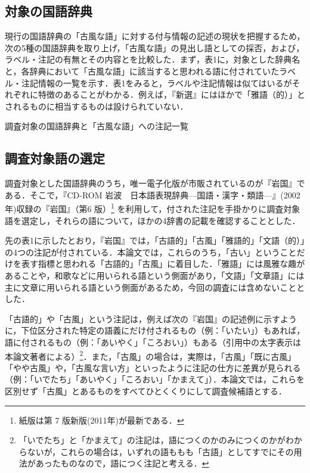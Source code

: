 \documentclass[japanese]{jnlp_1.4}
\newcommand{\MaruOne}{}
\newcommand{\MaruTwo}{}
\begin{document}
\subsection{対象の国語辞典}

現行の国語辞典の「古風な語」に対する付与情報の記述の現状を把握するため，次の5種の国語辞典を取り上げ，「古風な語」の見出し語としての採否，および，ラベル・注記の有無とその内容とを比較した．まず，表1に，対象とした辞典名と，各辞典において「古風な語」に該当すると思われる語に付されていたラベル・注記情報の一覧を示す．表1をみると，ラベルや注記情報は似てはいるがそれぞれに特徴のあることがわかる．例えば，『新選』にはほかで「雅語（的）」とされるものに相当するものは設けられていない．

\begin{table}[t]
\caption{調査対象の国語辞典と「古風な語」への注記一覧}

\end{table}


\subsection{調査対象語の選定}

調査対象とした国語辞典のうち，唯一電子化版が市販されているのが『岩国』である．そこで，『CD-ROM 岩波　日本語表現辞典—国語・漢字・類語—』(2002年)収録の『岩国』（第6
\linebreak
版）\footnote{紙版は第 7 版新版(2011年)が最新である．} を利用して，付された注記を手掛かりに調査対象語を選定し，それらの語について，ほかの4辞書の記載を確認することとした．

先の表1に示したとおり，『岩国』では，「古語的」「古風」「雅語的」「文語（的）」の4つの注記が付されている．本論文では，これらのうち，「古い」ということだけを表す指標と思われる「古語的」「古風」に着目した．「雅語」には風雅な趣があることや，和歌などに用いられる語という側面があり，「文語」「文章語」には主に文章に用いられる語という側面があるため，今回の調査には含めないこととした．

「古語的」や「古風」という注記は，例えば次の『岩国』の記述例に示すように，下位区分された特定の語義にだけ付されるもの（例：「いたい」）もあれば，語に付されるもの（例：「あいやく」「ころおい」）もある（引用中の太字表示は本論文著者による）\footnote{「いでたち」と「かまえて」の注記は，語につくのか\MaruTwo のみにつくのかがわからないが，これらの場合は，いずれの語も\MaruOne も\MaruTwo も「古語」としてすでにその用法があったものなので，語につく注記と考える．}．また，「古風」の場合は，実際は，「古風」「既に古風」「やや古風」や，「古風な言い方」といったように注記の仕方に差異が見られる（例：「いでたち」「あいやく」「ころおい」「かまえて」）．本論文では，これらを区別せず「古風」とあるものをすべてひとくくりにして調査候補語とする．
\end{document}
